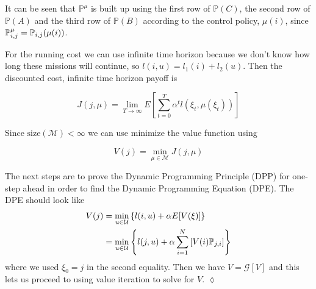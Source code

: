 \begin{example}
It can be seen that $\mathbb{P}^\mu$ is built up using the first row of $\mathbb{P} (C)$, the second row of $\mathbb{P} (A)$ and the third row of $\mathbb{P} (B)$ according to the control policy, $\mu(i)$, since $\mathbb{P}_{i,j}^\mu=\mathbb{P}_{i,j}(\mu(i))$.

For the running cost we can use infinite time horizon because we don't know how long these missions will continue, so $l (i,u)=l_1(i)+l_2(u)$.
Then the discounted cost, infinite time horizon payoff is

\begin{equation*}
J (j,\mu) = \lim_{T\to\infty}E\left[\sum_{t=0}^T \alpha^t l (\xi_t,\mu(\xi_t))\right]
\end{equation*}

Since $\text{size} (\mathcal{M})<\infty$ we can use minimize the value function using

\begin{equation*}
V (j) = \min_{\mu\in\mathcal{M}}J (j,\mu)
\end{equation*}

The next steps are to prove the Dynamic Programming Principle (DPP) for one-step ahead in order to find the Dynamic Programming Equation (DPE).
The DPE should look like
\begin{align*}
V(j) &= \min_{u\in\mathcal{U}}\left\lbrace l(i,u)+\alpha E[V(\xi)]\right\rbrace \\
&= \min_{u\in\mathcal{U}}\left\lbrace l(j,u) + \alpha \sum_{i=1}^N\left[V(i)\mathbb{P}_{j,i}\right]\right\rbrace
\end{align*}
where we used $\xi_0=j$ in the second equality.
Then we have $V=\mathcal{G}[V]$ and this lets us proceed to using value iteration to solve for $V$.
$\lozenge$
\end{example}%
